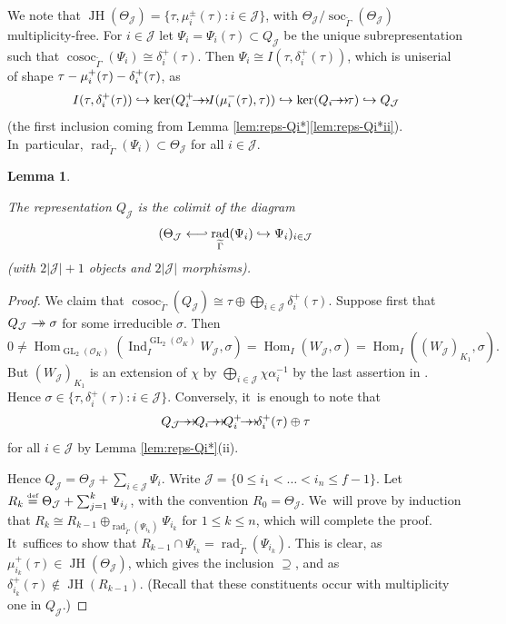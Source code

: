 \documentclass[JEP,XML,SOM,Unicode,NoFloatCountersInSection, NoEqCountersInSection,published]{cedram}
\newcommand\hto{\mathrel{\lhook\joinrel\to}}
\newcommand{\onto}{\mathchoice{\to\hspace*{-5mm}\to}{\mathrel{\hbox{$\to\hspace*{-2.85mm}\to$}}}{\to\hspace*{-3mm}\to}{\to\hspace*{-3mm}\to}}
\newcommand\from{\mathchoice{\longleftarrow}{\leftarrow}{\leftarrow}{\leftarrow}}
\def\hfrom{\mathrel{\from\joinrel\rhook}}
\let\wt\widetilde
\newcommand{\defeq}{\stackrel{\textrm{\tiny{\upshape{def}}}}{=}}
\newcommand{\cJ}{{\mathcal{J}}}
\newcommand{\cO}{\mathcal{O}}
\DeclareMathOperator{\cosoc}{cosoc}
\DeclareMathOperator{\GL}{GL}
\DeclareMathOperator{\Hom}{Hom}
\DeclareMathOperator{\Ind}{Ind}
\DeclareMathOperator{\JH}{\mathrm{JH}}
\DeclareMathOperator{\rad}{rad}
\DeclareMathOperator{\soc}{soc}
\theoremstyle{plain}
\newtheorem{lem}[prop]{Lemma}
\theoremstyle{definition}
\begin{document}
We note that $\JH(\Theta_\cJ) = \{\tau, \mu_i^{\pm}(\tau): i \in \cJ \}$, with $\Theta_\cJ/\soc_{\wt\Gamma}(\Theta_\cJ)$ multiplicity-free.
For $i \in \cJ$ let $\Psi_i=\Psi_i(\tau)\subset Q_\cJ$ be the unique subrepresentation such that $\cosoc_{\wt\Gamma}(\Psi_i) \cong \delta_i^+(\tau)$.
Then $\Psi_i \cong I(\tau,\delta_i^+(\tau))$, which is uniserial of shape $\tau \-- \mu_i^+(\tau) \-- \delta_i^+(\tau)$,
as
\[
I(\tau,\delta_i^+(\tau)) \hto \ker(Q_i^+ \onto I(\mu_i^-(\tau),\tau)) \hto \ker(Q_i\onto \tau) \hto Q_\cJ
\]
(the first inclusion coming from Lemma \ref{lem:reps-Qi*}\eqref{lem:reps-Qi*ii}). In~particular, $\rad_{\wt\Gamma}(\Psi_i) \subset \Theta_\cJ$ for all $i \in \cJ$.

\begin{lem}\label{lem:Q-vs-Theta}

The representation $Q_\cJ$ is the colimit of the diagram
\[
(\Theta_\cJ \hfrom \rad_{\wt\Gamma}(\Psi_i) \hto \Psi_i)_{i \in \cJ}
\]
(with $2|\cJ|+1$ objects and $2|\cJ|$ morphisms).
\end{lem}

\begin{proof}
We claim that $\cosoc_{\wt\Gamma}(Q_\cJ) \cong \tau \oplus \bigoplus_{i \in \cJ} \delta_i^+(\tau)$.
Suppose first that $Q_\cJ \onto \sigma$ for some irreducible $\sigma$.
Then
\begin{equation*}
0 \ne \Hom_{\GL_2(\cO_K)}(\Ind_I^{\GL_2(\cO_K)} W_\cJ,\sigma) = \Hom_I(W_\cJ,\sigma) = \Hom_I((W_\cJ)_{K_1},\sigma).
\end{equation*}
But $(W_\cJ)_{K_1}$ is an extension of $\chi$ by $\bigoplus_{i\in \cJ} \chi\alpha_i^{-1}$ by the last assertion in \cite[Lem.\,2.4(ii)]{yongquan-algebra}.
Hence $\sigma \in \{\tau, \delta_i^+(\tau): i \in \cJ\}$.
Conversely, it~is enough to note that
\[
Q_\cJ \onto Q_i \onto Q_i^+ \onto \delta_i^+(\tau) \oplus \tau
\]
for all $i \in \cJ$ by Lemma \ref{lem:reps-Qi*}(ii).

Hence $Q_\cJ = \Theta_\cJ + \sum_{i \in \cJ} \Psi_i$.
Write $\cJ = \{0 \le i_1 < \dots < i_n \le f-1\}$.
Let $R_k \defeq \Theta_\cJ + \sum_{j=1}^k \Psi_{i_j}$, with the convention $R_0=\Theta_\cJ$. We~will prove by induction that $R_{k} \cong R_{k-1} \oplus_{\rad_{\wt\Gamma}(\Psi_{i_k})} \Psi_{i_k}$ for $1 \le k \le n$, which will complete the proof. It~suffices to show that $R_{k-1} \cap \Psi_{i_k} = \rad_{\wt\Gamma}(\Psi_{i_k})$.
This is clear, as~$\mu^+_{i_k}(\tau) \in \JH(\Theta_\cJ)$, which gives the inclusion $\supseteq$, and as $\delta^+_{i_k}(\tau) \notin \JH(R_{k-1})$.
(Recall that these constituents occur with multiplicity one in $Q_\cJ$.)
\end{proof}
\end{document}
